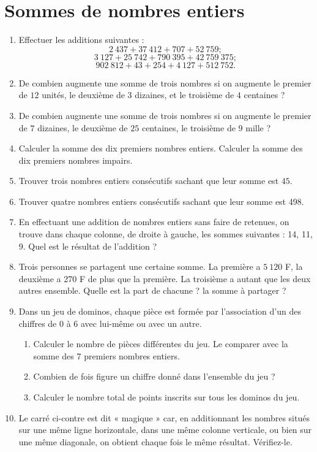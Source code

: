 \documentclass[12 pt]{report}
\theoremstyle{plain}
\newcounter{n}
\begin{document}
 \chapter{Sommes de nombres entiers}
 \begin{enumerate}
\item Effectuer les additions suivantes : 
\[ 2\ 437 + 37\ 412 + 707 + 52\ 759 ;\]
\[ 3~127+ 25~742+790~395 + 42~759~375 ;\]
\[ 902~812+ 43 + 254 + 4~127 + 512~752.\]
\item De combien augmente une somme de trois nombres si on augmente le premier de $12$ unités, le deuxième de $3$ dizaines, et le troisième de $4$ centaines ?
\item De combien augmente une somme de trois nombres si on augmente le premier de $7$ dizaines, le deuxième de $25$ centaines, le troisième de $9$ mille ?
\item Calculer la somme des dix premiers nombres entiers. 
Calculer la somme des dix premiers nombres impairs.
\item Trouver trois nombres entiers consécutifs sachant que leur somme est $45$. 
\item Trouver quatre nombres entiers consécutifs sachant que leur somme est 498. 
\item En effectuant une addition de nombres entiers sans faire de retenues, on 
trouve dans chaque colonne, de droite à gauche, les sommes suivantes : 14, 11, 9. Quel est le résultat de l'addition ? 
\item Trois personnes se partagent une certaine somme. La première a $5~120$ F, la deuxième a 270 F de plus que la première. La troisième a autant que les deux autres ensemble. Quelle est la part de chacune ? la somme à partager ?
\item Dans un jeu de dominos, chaque pièce est formée par l'association d'un des chiffres de $0$ à $6$ avec lui-même ou avec un autre. \begin{enumerate}
\item Calculer le nombre de pièces différentes du jeu. Le comparer avec la somme des 7 premiers nombres entiers.
\item Combien de fois figure un chiffre donné dans l'ensemble du jeu ? 
\item Calculer le nombre total de points inscrits sur tous les dominos du jeu.
\end{enumerate}
\item \begin{enumerate}
Le carré ci-contre est dit « magique » car, en additionnant les nombres situés sur une même ligne horizontale, dans une même colonne verticale, ou bien sur une même diagonale, on obtient chaque fois le même résultat. Vérifiez-le. 

\end{enumerate}
\end{enumerate}
\end{document}
